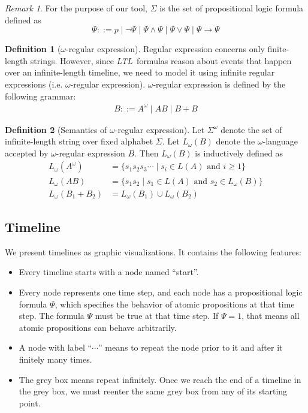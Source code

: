 \documentclass[preprint,12pt]{elsarticle}
\theoremstyle{definition}
\newtheorem{definition}{Definition}[section]
\theoremstyle{remark}
\newtheorem{remark}{Remark}[section]
\newcommand{\limplies}{\rightarrow}
\newcommand{\ltl}{\textit{LTL}}
\begin{document}
\begin{remark}
    For the purpose of our tool, $\Sigma$ is the set of propositional logic formula defined as
    \[
    \Psi ::= p \mid \neg \Psi \mid \Psi \land \Psi \mid \Psi \lor \Psi \mid \Psi \limplies \Psi
    \]
\end{remark}

\begin{definition}[$\omega$-regular expression]
    Regular expression concerns only finite-length strings. However, since \ltl\ formulas reason about events that happen over an infinite-length timeline, we need to model it using infinite regular expressions (i.e. $\omega$-regular expression). $\omega$-regular expression is defined by the following grammar:
    \begin{align*}
        B ::= A^{\omega} \mid AB \mid B + B
    \end{align*}
\end{definition}
\begin{definition}[Semantics of $\omega$-regular expression]\label{def:omega-semantics}
    Let $\Sigma^{\omega}$ denote the set of infinite-length string over fixed alphabet $\Sigma$. Let $L_{\omega}(B)$ denote the $\omega$-language accepted by $\omega$-regular expression $B$. Then $L_{\omega}(B)$ is inductively defined as
    \begin{align*}
        L_{\omega}(A^{\omega}) & = \{s_1s_2s_3\cdots \mid s_i \in L(A) \text{ and } i \ge 1\} \\
        L_{\omega}(AB) & = \{s_1s_2 \mid s_1 \in L(A) \text{ and } s_2 \in L_{\omega}(B)\} \\
        L_{\omega}(B_1 + B_2) &= L_{\omega}(B_1) \cup L_{\omega}(B_2)
    \end{align*}
\end{definition}

\subsection{Timeline}
We present timelines as graphic visualizations. It contains the following features:
\begin{itemize}
    \item Every timeline starts with a node named ``start''.
    \item Every node represents one time step, and each node has a propositional logic formula $\Psi$, which specifies the behavior of atomic propositions at that time step. The formula $\Psi$ must be true at that time step. If $\Psi = 1$, that means all atomic propositions can behave arbitrarily.
    \item A node with label ``$\cdots$'' means to repeat the node prior to it and after it finitely many times.
    \item The grey box means repeat infinitely. Once we reach the end of a timeline in the grey box, we must reenter the same grey box from any of its starting point.
\end{itemize}
\end{document}
